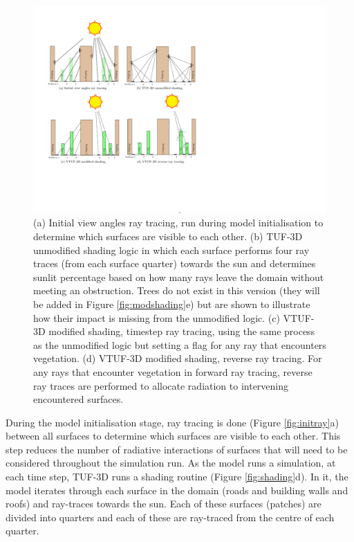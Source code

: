 \documentclass[final,3p,times,authoryear]{elsarticle}
\begin{document}
\begin{figure}[!htbp]
\includegraphics[trim = 13mm 50mm 52mm 15mm, clip, scale=0.75]{images/ModelDiagramsCombined2.pdf}
   \caption{(a) Initial view angles ray tracing, run during model initialisation to determine which surfaces are visible to each other. \label{fig:initray} (b) TUF-3D unmodified shading logic in which each surface performs four ray traces (from each surface quarter) towards the sun and determines sunlit percentage based on how many rays leave the domain without meeting an obstruction. Trees do not exist in this version (they will be added in Figure \ref{fig:modshading}e) but are shown to illustrate how their impact is missing from the unmodified logic. \label{fig:shading} (c) VTUF-3D modified shading, timestep ray tracing, using the same process as the unmodified logic but setting a flag for any ray that encounters vegetation. \label{fig:modshading} (d) VTUF-3D modified shading, reverse ray tracing. For any rays that encounter vegetation in forward ray tracing, reverse ray traces are performed to allocate radiation to intervening encountered surfaces. \label{fig:modshadingreverse}} 
\end{figure}


During the model initialisation stage, ray tracing is done (Figure \ref{fig:initray}a) between all surfaces to determine which surfaces are visible to each other. This step reduces the number of radiative interactions of surfaces that will need to be considered throughout the simulation run. As the model runs a simulation, at each time step, TUF-3D runs a shading routine (Figure \ref{fig:shading}d). In it, the model iterates through each surface in the domain (roads and building walls and roofs) and ray-traces towards the sun. Each of these surfaces (patches) are divided into quarters and each of these are ray-traced from the centre of each quarter. 
\end{document}
